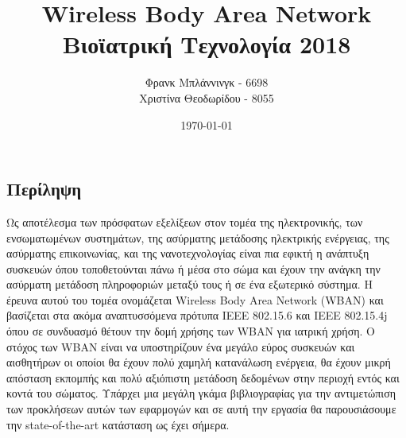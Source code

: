 \documentclass[11pt]{article}
\title{Wireless Body Area Network\\ Βιοϊατρική Τεχνολογία 2018}
\author{Φρανκ Μπλάννινγκ - 6698\\ Χριστίνα Θεοδωρίδου - 8055}
\date{\today}
\begin{document}
\maketitle

\subsection*{Περίληψη}
Ως αποτέλεσμα των πρόσφατων εξελίξεων στον τομέα της ηλεκτρονικής, των
ενσωματωμένων συστημάτων, της ασύρματης μετάδοσης ηλεκτρικής
ενέργειας, της ασύρματης επικοινωνίας, και της νανοτεχνολογίας είναι
πια εφικτή η ανάπτυξη συσκευών όπου τοποθετούνται πάνω ή μέσα στο σώμα
και έχουν την ανάγκη την ασύρματη μετάδοση πληροφοριών μεταξύ τους ή
σε ένα εξωτερικό σύστημα. Η έρευνα αυτού του τομέα ονομάζεται Wireless
Body Area Network (WBAN) και βασίζεται στα ακόμα αναπτυσσόμενα πρότυπα
IEEE 802.15.6 και IEEE 802.15.4j όπου σε συνδυασμό θέτουν την δομή
χρήσης των WBAN για ιατρική χρήση. Ο στόχος των WBAN είναι να
υποστηρίζουν ένα μεγάλο εύρος συσκευών και αισθητήρων οι οποίοι θα
έχουν πολύ χαμηλή κατανάλωση ενέργεια, θα έχουν μικρή απόσταση
εκπομπής και πολύ αξιόπιστη μετάδοση δεδομένων στην περιοχή εντός και
κοντά του σώματος. Υπάρχει μια μεγάλη γκάμα βιβλιογραφίας για την
αντιμετώπιση των προκλήσεων αυτών των εφαρμογών και σε αυτή την
εργασία θα παρουσιάσουμε την state-of-the-art κατάσταση ως έχει
σήμερα.





\end{document}
